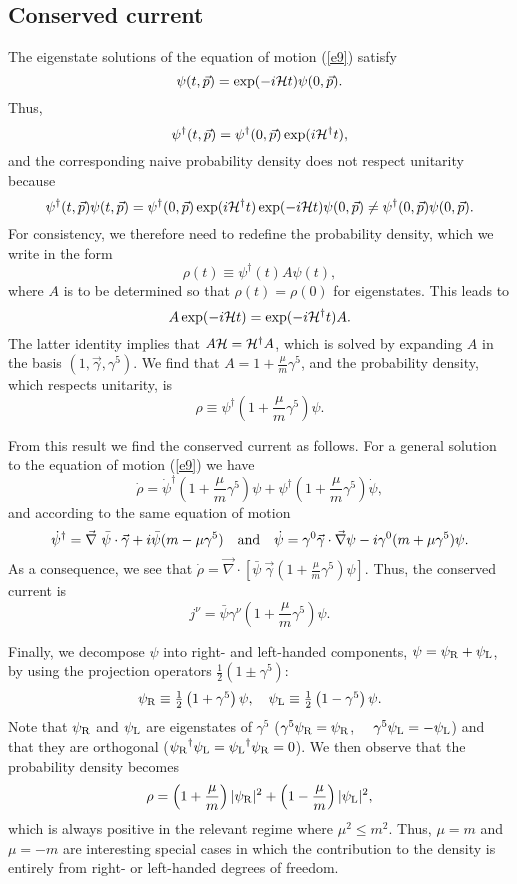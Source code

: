 \documentclass[11pt,prd,aps,amssymb,amsmath,tightenlines,showpacs]{revtex4}
\newcommand{\half}{\textstyle{\frac{1}{2}}}
\newcommand{\cH}{{\cal H}}
\begin{document}
\subsection{Conserved current}
The eigenstate solutions of the equation of motion (\ref{e9}) satisfy
$$\psi(t,\vec p)=\exp(-i\cH t)\psi(0,\vec p).$$
Thus,
$$\psi^\dag(t,\vec p)=\psi^\dag(0,\vec p)\exp(i\cH^\dag t),$$
and the corresponding naive probability density does not respect unitarity
because
$$\psi^\dag(t,\vec p)\psi(t,\vec p)=\psi^\dag(0,\vec p)\exp(i{\cal
H}^\dag t)\exp(-i\cH t)\psi(0,\vec p)\ne\psi^\dag(0,\vec p)\psi(0,\vec
p).$$
For consistency, we therefore need to redefine the probability density,
which we write in the form
$$\rho(t)\equiv\psi^\dag(t)A\psi(t),$$
where $A$ is to be determined so that $\rho(t)=\rho(0)$ for eigenstates. This
leads to
$$A\exp(-i\cH t)=\exp(-i\cH^\dag t)A.$$
The latter identity implies that $A\cH=\cH^\dag A$, which is solved by expanding
$A$ in the basis $(1,\vec\gamma,\gamma^5)$. We find that $A=1+\frac{\mu}{m}
\gamma^5$, and the probability density, which respects unitarity, is 
$$\rho\equiv\psi^\dag\left(1+\frac{\mu}{m}\gamma^5\right)\psi.$$

From this result we find the conserved current as follows. For a general
solution to the equation of motion (\ref{e9}) we have
$$\dot\rho=\dot\psi^\dag\left(1+\frac{\mu}{m}\gamma^5\right)\psi+\psi^\dag
\left(1+\frac{\mu}{m}\gamma^5\right)\dot\psi,$$
and according to the same equation of motion 
$$\dot\psi^\dag=\vec\nabla~\bar\psi\cdot\vec\gamma+i\bar\psi(m-\mu\gamma^5)\quad
{\rm and}\quad\dot\psi=\gamma^0\vec\gamma\cdot\vec\nabla\psi-i\gamma^0(m+\mu
\gamma^5)\psi.$$
As a consequence, we see that $\dot\rho=\vec\nabla\cdot\left[\bar\psi~\vec\gamma
\left(1+\frac{\mu}{m}\gamma^5\right)\psi\right]$. Thus, the conserved current is
$$j^\nu=\bar\psi\gamma^\nu\left(1+\frac{\mu}{m}\gamma^5\right)\psi.$$

Finally, we decompose $\psi$ into right- and left-handed components, $\psi=
\psi_{\rm R}+\psi_{\rm L}$, by using the projection operators $\half\left(1\pm
\gamma^5\right)$:
$$\psi_{\rm R}\equiv\half\left(1+\gamma^5\right)\psi,\quad
\psi_{\rm L}\equiv\half\left(1-\gamma^5\right)\psi.$$
Note that $\psi_{\rm R}$ and $\psi_{\rm L}$ are eigenstates of $\gamma^5$
($\gamma^5\psi_{\rm R}=\psi_{\rm R}$, $\quad\gamma^5\psi_{\rm L}=-\psi_{\rm L}$)
and that they are orthogonal (${\psi_{\rm R}}^\dag\psi_{\rm L}={\psi_{\rm
L}}^\dag\psi_{\rm R}=0$). We then observe that the probability density becomes
$$\rho=\left(1+\frac{\mu}{m}\right)|\psi_{\rm R}|^2+\left(1-\frac{\mu}{m}\right)
|\psi_{\rm L}|^2,$$
which is always positive in the relevant regime where $\mu^2\leq m^2$. 
Thus, $\mu=m$ and $\mu=-m$ are interesting special cases in which the
contribution to the density is entirely from right- or left-handed degrees
of freedom.
\end{document}
